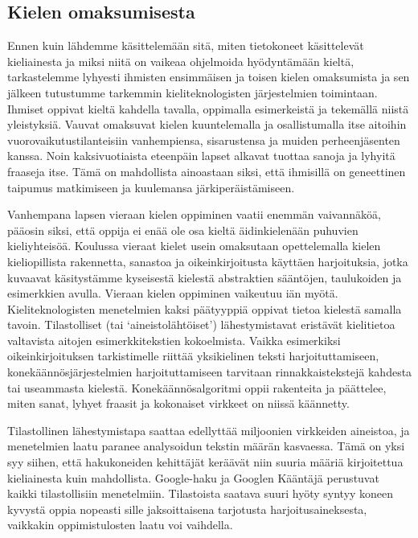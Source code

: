 \documentclass[]{../../metanetpaper}
\begin{document}
\begin{multicols}{2}
\subsection{Kielen omaksumisesta}


Ennen kuin lähdemme käsittelemään sitä, miten tietokoneet käsittelevät
kieliainesta ja miksi niitä on vaikeaa ohjelmoida hyödyntämään kieltä,
tarkastelemme lyhyesti ihmisten ensimmäisen ja toisen kielen omaksumista ja sen
jälkeen tutustumme tarkemmin kieliteknologisten järjestelmien toimintaan.
Ihmiset oppivat kieltä kahdella tavalla, oppimalla esimerkeistä ja
tekemällä niistä yleistyksiä.  Vauvat omaksuvat kielen kuuntelemalla
ja osallistumalla itse aitoihin vuorovaikutustilanteisiin
vanhempiensa, sisarustensa ja muiden perheenjäsenten kanssa. Noin
kaksivuotiaista eteenpäin lapset alkavat tuottaa sanoja ja lyhyitä
fraaseja itse. Tämä on mahdollista ainoastaan siksi, että ihmisillä on
geneettinen taipumus matkimiseen ja kuulemansa järkiperäistämiseen.

Vanhempana lapsen vieraan kielen oppiminen vaatii enemmän vaivannäköä, pääosin
siksi, että oppija ei enää ole osa kieltä äidinkielenään puhuvien kieliyhteisöä.
Koulussa vieraat kielet usein omaksutaan opettelemalla kielen kieliopillista
rakennetta, sanastoa ja oikeinkirjoitusta käyttäen harjoituksia, jotka kuvaavat
käsitystämme kyseisestä kielestä abstraktien sääntöjen, taulukoiden ja
esimerkkien avulla. Vieraan kielen oppiminen vaikeutuu iän myötä.
Kieliteknologisten menetelmien kaksi päätyyppiä oppivat tietoa kielestä samalla
tavoin. Tilastolliset (tai ‘aineistolähtöiset’) lähestymistavat eristävät
kielitietoa valtavista aitojen esimerkkitekstien kokoelmista. Vaikka
esimerkiksi oikeinkirjoituksen tarkistimelle riittää yksikielinen teksti
harjoituttamiseen, konekäännösjärjestelmien harjoituttamiseen tarvitaan
rinnakkaistekstejä kahdesta tai useammasta kielestä. Konekäännösalgoritmi oppii
rakenteita ja päättelee, miten sanat, lyhyet fraasit ja kokonaiset virkkeet on
niissä käännetty.

Tilastollinen lähestymistapa saattaa edellyttää miljoonien virkkeiden
aineistoa, ja menetelmien laatu paranee analysoidun tekstin määrän kasvaessa.
Tämä on yksi syy siihen, että hakukoneiden kehittäjät keräävät niin suuria
määriä kirjoitettua kieliainesta kuin mahdollista. Google-haku ja Googlen
Kääntäjä perustuvat kaikki tilastollisiin menetelmiin. Tilastoista saatava
suuri hyöty syntyy koneen kyvystä oppia nopeasti sille jaksoittaisena
tarjotusta harjoitusaineksesta, vaikkakin oppimistulosten laatu voi vaihdella.


\end{multicols}
\end{document}
